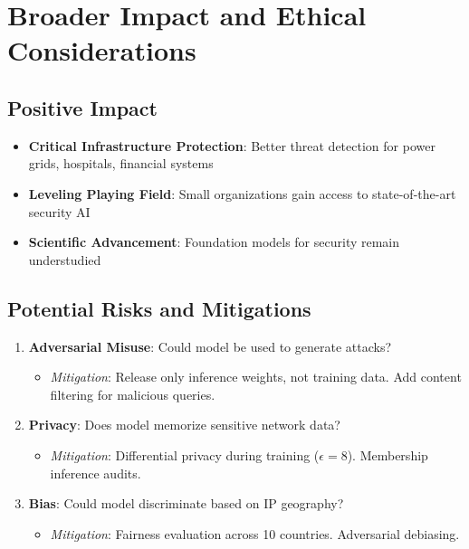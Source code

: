 \documentclass[11pt]{article}
\begin{document}
\section{Broader Impact and Ethical Considerations}

\subsection{Positive Impact}

\begin{itemize}
    \item \textbf{Critical Infrastructure Protection}: Better threat detection for power grids, hospitals, financial systems
    \item \textbf{Leveling Playing Field}: Small organizations gain access to state-of-the-art security AI
    \item \textbf{Scientific Advancement}: Foundation models for security remain understudied
\end{itemize}

\subsection{Potential Risks and Mitigations}

\begin{enumerate}
    \item \textbf{Adversarial Misuse}: Could model be used to generate attacks?
    \begin{itemize}
        \item \textit{Mitigation}: Release only inference weights, not training data. Add content filtering for malicious queries.
    \end{itemize}

    \item \textbf{Privacy}: Does model memorize sensitive network data?
    \begin{itemize}
        \item \textit{Mitigation}: Differential privacy during training ($\epsilon = 8$). Membership inference audits.
    \end{itemize}

    \item \textbf{Bias}: Could model discriminate based on IP geography?
    \begin{itemize}
        \item \textit{Mitigation}: Fairness evaluation across 10 countries. Adversarial debiasing.
    \end{itemize}
\end{enumerate}
\end{document}

